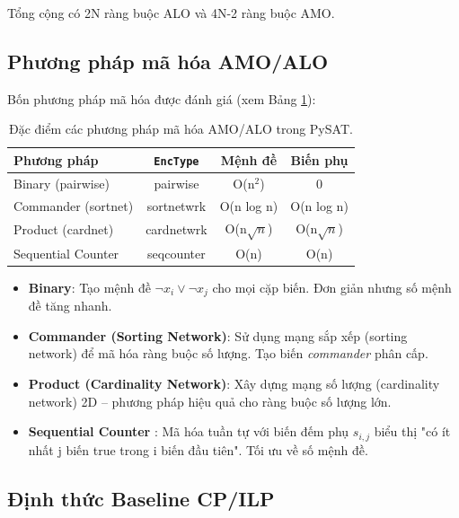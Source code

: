 \documentclass[a4paper,fleqn]{cas-sc}
\begin{document}
Tổng cộng có 2N ràng buộc ALO và 4N-2 ràng buộc AMO.

\subsection{Phương pháp mã hóa AMO/ALO}
\label{sec:encodings}

Bốn phương pháp mã hóa được đánh giá (xem Bảng \ref{tab:encodings}):

\begin{table}[htbp]
\centering
\caption{Đặc điểm các phương pháp mã hóa AMO/ALO trong PySAT.}
\label{tab:encodings}
\begin{tabular}{lccc}
\toprule
\textbf{Phương pháp} & \texttt{EncType} & \textbf{Mệnh đề} & \textbf{Biến phụ} \\
\midrule
Binary (pairwise)     & pairwise      & O(n$^2$)     & 0           \\
Commander (sortnet)   & sortnetwrk    & O(n log n)   & O(n log n)  \\
Product (cardnet)     & cardnetwrk    & O(n$\sqrt{n}$) & O(n$\sqrt{n}$) \\
Sequential Counter    & seqcounter    & O(n)         & O(n)        \\
\bottomrule
\end{tabular}
\end{table}

\begin{itemize}
    \item \textbf{Binary}: Tạo mệnh đề $\lnot x_i \lor \lnot x_j$ cho mọi cặp biến. Đơn giản nhưng số mệnh đề tăng nhanh.
    \item \textbf{Commander (Sorting Network)}: Sử dụng mạng sắp xếp (sorting network) để mã hóa ràng buộc số lượng. Tạo biến \textit{commander} phân cấp.
    \item \textbf{Product (Cardinality Network)}: Xây dựng mạng số lượng (cardinality network) 2D -- phương pháp hiệu quả cho ràng buộc số lượng lớn.
    \item \textbf{Sequential Counter} \citep{sinz2005towards}: Mã hóa tuần tự với biến đếm phụ $s_{i,j}$ biểu thị "có ít nhất j biến true trong i biến đầu tiên". Tối ưu về số mệnh đề.
\end{itemize}

\subsection{Định thức Baseline CP/ILP}
\label{sec:baselines}
\end{document}
